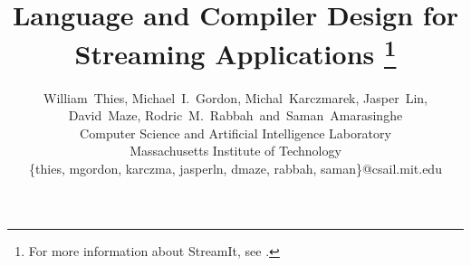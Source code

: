 \documentclass[10pt]{article}
\begin{document}
\title{Language and Compiler Design for Streaming Applications%
\thanks{For more information about StreamIt, see \streamiturl.}}

\author{William~Thies, Michael~I.~Gordon, Michal~Karczmarek, Jasper~Lin,\\ 
 David~Maze, Rodric~M.~Rabbah~and~Saman~Amarasinghe\\
 Computer Science and Artificial Intelligence Laboratory\\
 Massachusetts Institute of Technology\\
 \{thies, mgordon, karczma, jasperln, dmaze, rabbah, saman\}@csail.mit.edu}

\maketitle
\thispagestyle{empty}


\begin{abstract}

\end{abstract}
\end{document}
